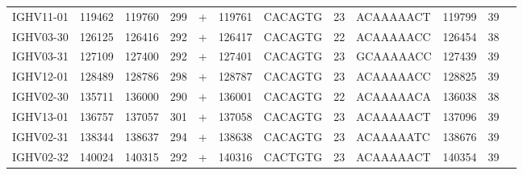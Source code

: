 \begin{tabular}{lrrrlrlllrrl}
  IGHV11-01 & 119462 & 119760 & 299 & + & 119761 & CACAGTG & 23 & ACAAAAACT & 119799 & 39 &  \\ 
  IGHV03-30 & 126125 & 126416 & 292 & + & 126417 & CACAGTG & 22 & ACAAAAACC & 126454 & 38 &  \\ 
  IGHV03-31 & 127109 & 127400 & 292 & + & 127401 & CACAGTG & 23 & GCAAAAACC & 127439 & 39 &  \\ 
  IGHV12-01 & 128489 & 128786 & 298 & + & 128787 & CACAGTG & 23 & ACAAAAACC & 128825 & 39 &  \\ 
  IGHV02-30 & 135711 & 136000 & 290 & + & 136001 & CACAGTG & 22 & ACAAAAACA & 136038 & 38 &  \\ 
  IGHV13-01 & 136757 & 137057 & 301 & + & 137058 & CACAGTG & 23 & ACAAAAACT & 137096 & 39 &  \\ 
  IGHV02-31 & 138344 & 138637 & 294 & + & 138638 & CACAGTG & 23 & ACAAAAATC & 138676 & 39 &  \\ 
  IGHV02-32 & 140024 & 140315 & 292 & + & 140316 & CACTGTG & 23 & ACAAAAACT & 140354 & 39 &  \\ 
   \bottomrule \end{tabular}

